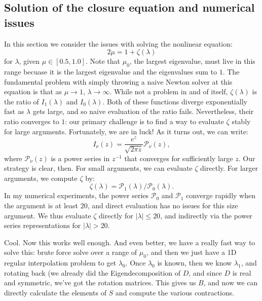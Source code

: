 \documentclass{article}
\begin{document}
\subsection{Solution of the closure equation and numerical issues}

In this section we consider the issues with solving the nonlinear equation:
\begin{equation}
    2\mu = 1 + \zeta(\lambda)
\end{equation}
for $\lambda$, given $\mu\in[0.5,1.0]$. Note that $\mu_0$, the largest eigenvalue, must live in this range becuase it is the largest eigenvalue and the eigenvalues sum to $1$. The fundamental problem with simply throwing a naive Newton solver at this equation is that as $\mu\to1$, $\lambda\to\infty$. While not a problem in and of itself, $\zeta(\lambda)$ is the ratio of $I_1(\lambda)$ and $I_0(\lambda)$. Both of these functions diverge exponentially fast as $\lambda$ gets large, and so naive evaluation of the ratio fails. Nevertheless, their ratio converges to $1$: our primary challenge is to find a way to evaluate $\zeta$ stably for large arguments. Fortunately, we are in luck! As it turns out, we can write:
\begin{equation}
    I_\nu(z) = \frac{e^z}{\sqrt{2\pi z}}\mathcal{P}_\nu(z),
\end{equation}
where $\mathcal{P}_\nu(z)$ is a power series in $z^{-1}$ that converges for sufficiently large $z$. Our strategy is clear, then. For small arguments, we can evaluate $\zeta$ directly. For larger arguments, we compute $\zeta$ by:
\begin{equation}
    \zeta(\lambda) = \mathcal{P}_1(\lambda)/\mathcal{P}_0(\lambda).
\end{equation}
In my numerical experiments, the power series $\mathcal{P}_0$ and $\mathcal{P}_1$ converge rapidly when the argument is at least $20$, and direct evaluation has no issues for this size argument. We thus evaluate $\zeta$ directly for $|\lambda|\leq20$, and indirectly via the power series representations for $|\lambda|>20$.


Cool.  Now this works well enough. And even better, we have a really fast way to solve this: brute force solve over a range of $\mu_0$, and then we just have a 1D regular interpolation problem to get $\lambda_0$. Once $\lambda_0$ is known, then we know $\lambda_1$, and rotating back (we already did the Eigendecomposition of $D$, and since $D$ is real and symmetric, we've got the rotation matrices. This gives us $B$, and now we can directly calculate the elements of $S$ and compute the various contractions.\\
\end{document}
